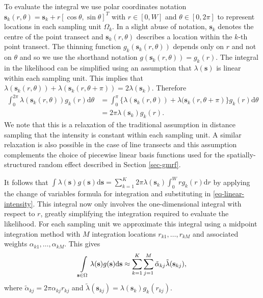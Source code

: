 \documentclass{statsoc}
\newcommand{\bs}{\mathbf{s}}
\newcommand{\tl}{\tilde{\lambda}}   %
\begin{document}
To evaluate the integral we use polar coordinates notation $\bs_k(r, \theta) = \bs_k + r\left[\cos\theta, \sin\theta \right]^T$ with $r \in [0, W]$ and $\theta \in [0, 2\pi]$ to represent locations in each sampling unit $\Omega_k$.  In a slight abuse of notation, $\bs_k$ denotes the centre of the point transect and $\bs_k(r,\theta)$ describes a location within the $k$-th point transect. The thinning function $g_k(\bs_k(r, \theta))$ depends only on $r$ and not on $\theta$ and so we use the shorthand notation $ g(\bs_k(r, \theta)) = g_k(r)$. The integral in the likelihood can be simplified using an assumption that $\lambda(\bs)$ is linear within each sampling unit.  This implies that $\lambda(\bs_k(r, \theta)) + \lambda(\bs_k(r, \theta + \pi)) = 2\lambda(\bs_k)$.  Therefore
\begin{align}
\label{eq-linear-intensity}
	\int_0^{2\pi} \lambda(\bs_k(r, \theta))g_k(r)\mathrm{d}\theta &= \int_0^\pi \{\lambda(\bs_k(r, \theta)) + \lambda(\bs_k(r, \theta + \pi) \} g_k(r)\mathrm{d}\theta \nonumber \\
	&= 2\pi \lambda(\bs_k)g_k(r).
\end{align}
We note that this is a relaxation of the traditional assumption in distance sampling that the intensity is constant within each sampling unit.  A similar relaxation is also possible in the case of line transects \citep{yuan_point_2017} and this assumption complements the choice of piecewise linear basis functions used for the spatially-structured random effect described in Section \ref{sec-gmrf}.  

It follows that $\int \lambda(\bs)g(\bs) \mathrm{d}\bs = \sum_{k=1}^K 2\pi \lambda(\bs_k) \int_0^W r g_k(r)\mathrm{d}r$ by applying the change of variables formula for integration and substituting in \eqref{eq-linear-intensity}.  This integral now only involves the one-dimensional integral with respect to $r$, greatly simplifying the integration required to evaluate the likelihood.  For each sampling unit we approximate this integral using a midpoint integration method with $M$ integration locations $r_{k1}, \ldots, r_{kM}$ and associated weights $\alpha_{k1}, \ldots, \alpha_{kM}$.  This gives
\begin{equation*}
	\int\displaylimits_{\bs \in \Omega} \lambda(\bs)g(\bs)\mathrm{d}\bs \approx \sum_{k=1}^K \sum_{j=1}^M \tilde{\alpha}_{kj} \tl(\bs_{kj}) ,
\end{equation*}
where $\tilde{\alpha}_{kj} = 2\pi \alpha_{kj}r_{kj}$ and $\tl(\bs_{kj}) = \lambda(\bs_k) g_k(r_{kj})$.
\end{document}
